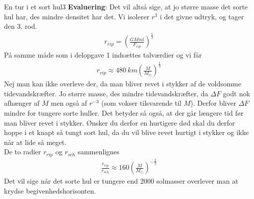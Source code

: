 \begin{opgave}{En tur i et sort hul}{3}
\textbf{Evaluering}: Det vil altså sige, at jo større masse det sorte hul har, des mindre densitet har det. 
\opg Vi isolerer $r^3$ i det givne udtryk, og tager den 3. rod. 
\begin{align*}
r_{rip} = \left( \frac{GMml}{F_{rip}}\right) ^{\frac{1}{3}}
\end{align*}
På samme måde som i delopgave 1 indsættes talværdier og vi får
\begin{align*}
r_{rip} \approx 480~\si{km} \left( \frac{M}{M_{\odot}}\right) ^{\frac{1}{3}}
\end{align*}
\opg Nej man kan ikke overleve der, da man bliver revet i stykker af de voldsomme tidevandskræfter. Jo større masse, des mindre tidevandskræfter, da $\Delta F$ godt nok afhænger af $M$ men også af $r^{-3}$ (som vokser tilsvarende til $M$). Derfor bliver $\Delta F$ mindre for tungere sorte huller. Det betyder så også, at der går længere tid før man bliver revet i stykker. Ønsker du derfor en hurtigere død skal du derfor hoppe i et knapt så tungt sort hul, da du vil blive revet hurtigt i stykker og ikke når at lide så meget. \\
De to radier $r_{rip}$ og $r_{sch}$ sammenlignes
\begin{align*}
\frac{r_{rip}}{r_{sch}} \approx 160 \left( \frac{M}{M_{\odot}}\right) ^{-\frac{2}{3}}
\end{align*}
Det vil sige når det sorte hul er tungere end 2000 solmasser overlever man at krydse begivenhedshorisonten. 
\end{opgave}

